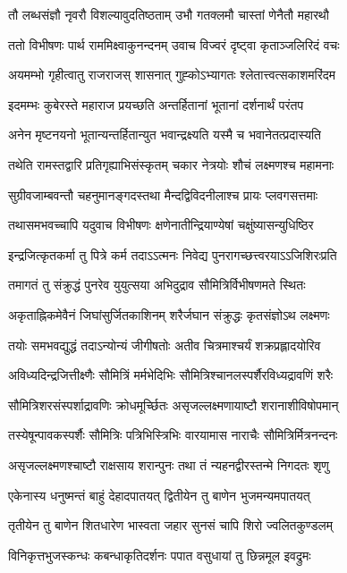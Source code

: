 \twolineshloka
{तौ लब्धसंज्ञौ नृवरौ विशल्यावुदतिष्ठताम्}
{उभौ गतक्लमौ चास्तां णेनैतौ महारथौ}


\twolineshloka
{ततो विभीषणः पार्थ राममिक्ष्वाकुनन्दनम्}
{उवाच विज्वरं दृष्ट्वा कृताञ्जलिरिदं वचः}


\twolineshloka
{अयमम्भो गृहीत्वातु राजराजस् शासनात्}
{गुह्कोऽभ्यागतः श्लेतात्त्वत्सकाशमरिंदम}


\twolineshloka
{इदमम्भः कुबेरस्ते महाराज प्रयच्छति}
{अन्तर्हितानां भूतानां दर्शनार्थं परंतप}


\twolineshloka
{अनेन मृष्टनयनो भूतान्यन्तर्हितान्युत}
{भवान्द्रक्ष्यति यस्मै च भवानेतत्प्रदास्यति}


\twolineshloka
{तथेति रामस्तद्वारि प्रतिगृह्याभिसंस्कृतम्}
{चकार नेत्रयोः शौचं लक्ष्मणश्च महामनाः}


\twolineshloka
{सुग्रीवजाम्बवन्तौ चहनुमानङ्गदस्तथा}
{मैन्दद्विविदनीलाश्च प्रायः प्लवगसत्तमाः}


\twolineshloka
{तथासमभवच्चापि यदुवाच विभीषणः}
{क्षणेनातीन्द्रियाण्येषां चक्षुंष्यासन्युधिष्ठिर}


\twolineshloka
{इन्द्रजित्कृतकर्मा तु पित्रे कर्म तदाऽऽत्मनः}
{निवेद्य पुनरागच्छत्त्वरयाऽऽजिशिरःप्रति}


\twolineshloka
{तमागतं तु संक्रुद्धं पुनरेव युयुत्सया}
{अभिदुद्राव सौमित्रिर्विभीषणमते स्थितः}


\twolineshloka
{अकृताह्निकमेवैनं जिघांसुर्जितकाशिनम्}
{शरैर्जघान संक्रुद्धः कृतसंज्ञोऽथ लक्ष्मणः}


\twolineshloka
{तयोः समभवद्युद्धं तदाऽन्योन्यं जीगीषतोः}
{अतीव चित्रमाश्चर्यं शक्रप्रह्लादयोरिव}


\twolineshloka
{अविध्यदिन्द्रजित्तीक्ष्णैः सौमित्रिं मर्मभेदिभिः}
{सौमित्रिश्चानलस्पर्शैरविध्यद्रावणिं शरैः}


\twolineshloka
{सौमित्रिशरसंस्पर्शाद्रावणिः क्रोधमूर्च्छितः}
{असृजल्लक्ष्मणायाष्टौ शरानाशीविषोपमान्}


\twolineshloka
{तस्येषून्पावकस्पर्शैः सौमित्रिः पत्रिभिस्त्रिभिः}
{वारयामास नाराचैः सौमित्रिर्मित्रनन्दनः}


\twolineshloka
{असृजल्लक्ष्मणश्चाष्टौ राक्षसाय शरान्पुनः}
{तथा तं न्यहनद्वीरस्तन्मे निगदतः शृणु}


\twolineshloka
{एकेनास्य धनुष्मन्तं बाहुं देहादपातयत्}
{द्वितीयेन तु बाणेन भुजमन्यमपातयत्}


\twolineshloka
{तृतीयेन तु बाणेन शितधारेण भास्वता}
{जहार सुनसं चापि शिरो ज्वलितकुण्डलम्}


\twolineshloka
{विनिकृत्तभुजस्कन्धः कबन्धाकृतिदर्शनः}
{पपात वसुधायां तु छिन्नमूल इवद्रुमः}



